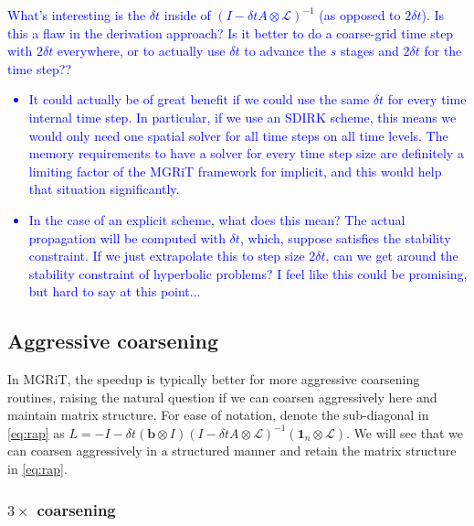 \documentclass[a4paper,12pt]{article}
\newcommand{\tcb}{\textcolor{blue}}
\begin{document}
\tcb{What's interesting is the $\delta t$ inside of $(I - \delta tA\otimes\mathcal{L})^{-1}$ (as opposed to $2\delta t$).
Is this a flaw in the derivation approach? Is it better to do a coarse-grid time step with $2\delta t$ everywhere, or to actually use
$\delta t$ to advance the $s$ stages and $2\delta t$ for the time step??
\begin{itemize}
\item It could actually be of great benefit if we could use the same $\delta t$ for every time internal time step. In particular, if we
use an SDIRK scheme, this means we would only need one spatial solver for all time steps on all time levels. The memory
requirements to have a solver for every time step size are definitely a limiting factor of the MGRiT framework for implicit, and this
would help that situation significantly. 
\item In the case of an explicit scheme, what does this mean? The actual propagation will be computed with $\delta t$, which,
suppose satisfies the stability constraint. If we just extrapolate this to step size $2\delta t$, can we get around the stability
constraint of hyperbolic problems? I feel like this could be promising, but hard to say at this point...
\end{itemize}
}

\subsection{Aggressive coarsening}

In MGRiT, the speedup is typically better for more aggressive coarsening routines, raising the natural question if we can
coarsen aggressively here and maintain matrix structure. For ease of notation, denote the sub-diagonal in \eqref{eq:rap}
as $L = -I - \delta t(\mathbf{b}\otimes I )(I - \delta tA\otimes \mathcal{L})^{-1}(\mathbf{1}_n \otimes \mathcal{L})$. We will
see that we can coarsen aggressively in a structured manner and retain the matrix structure in \eqref{eq:rap}.


\subsubsection{$3\times$ coarsening}
\end{document}

